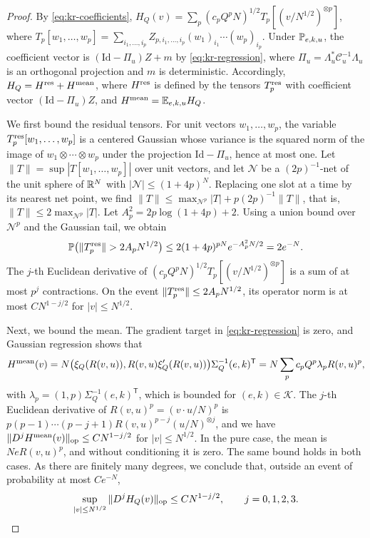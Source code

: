 \begin{proof}
By \eqref{eq:kr-coefficients}, $H_Q(v)=\sum_p(c_pQ^pN)^{1/2}T_p[(v/N^{1/2})^{\otimes p}]$, where $T_p[w_1,\dots,w_p]=\sum_{i_1,\dots,i_p}Z_{p,i_1,\dots,i_p}(w_1)_{i_1}\cdots(w_p)_{i_p}$. Under $\mathbb P_{e,k,u}$, the coefficient vector is $(\mathrm{Id}-\Pi_u)Z+m$ by \eqref{eq:kr-regression}, where $\Pi_u=\Lambda_u^*\mathcal C_u^{-1}\Lambda_u$ is an orthogonal projection and $m$ is deterministic. Accordingly, $H_Q=H^{\rm res}+H^{\rm mean}$, where $H^{\rm res}$ is defined by the tensors $T_p^{\rm res}$ with coefficient vector $(\mathrm{Id}-\Pi_u)Z$, and $H^{\rm mean}=\mathbb E_{e,k,u}H_Q$.

We first bound the residual tensors. For unit vectors $w_1,\dots,w_p$, the variable $T^{\rm res}_p[w_1,\dots,w_p]$ is a centered Gaussian whose variance is the squared norm of the image of $w_1\otimes\cdots\otimes w_p$ under the projection $\mathrm{Id}-\Pi_u$, hence at most one. Let $\|T\|=\sup|T[w_1,\dots,w_p]|$ over unit vectors, and let $\mathcal N$ be a $(2p)^{-1}$-net of the unit sphere of $\mathbb R^N$ with $|\mathcal N|\le(1+4p)^N$. Replacing one slot at a time by its nearest net point, we find $\|T\|\le\max_{\mathcal N^p}|T|+p(2p)^{-1}\|T\|$, that is, $\|T\|\le2\max_{\mathcal N^p}|T|$. Let $A_p^2=2p\log(1+4p)+2$. Using a union bound over $\mathcal N^p$ and the Gaussian tail, we obtain
\[
\Pp\bigl(\|T_p^{\rm res}\|>2A_pN^{1/2}\bigr)\le2(1+4p)^{pN}e^{-A_p^2N/2}=2e^{-N}.
\]
The $j$-th Euclidean derivative of $(c_pQ^pN)^{1/2}T_p[(v/N^{1/2})^{\otimes p}]$ is a sum of at most $p^j$ contractions. On the event $\|T^{\rm res}_p\|\le2A_pN^{1/2}$, its operator norm is at most $CN^{1-j/2}$ for $|v|\le N^{1/2}$.

Next, we bound the mean. The gradient target in \eqref{eq:kr-regression} is zero, and Gaussian regression shows that
\[
H^{\rm mean}(v)=N\bigl(\xi_Q(R(v,u)),R(v,u)\xi_Q'(R(v,u))\bigr)\Sigma_Q^{-1}(e,k)^{\mathsf T}=N\sum_pc_pQ^p\lambda_pR(v,u)^p,
\]
with $\lambda_p=(1,p)\Sigma_Q^{-1}(e,k)^{\mathsf T}$, which is bounded for $(e,k)\in\mathcal K$. The $j$-th Euclidean derivative of $R(v,u)^p=(v\cdot u/N)^p$ is $p(p-1)\cdots(p-j+1)R(v,u)^{p-j}(u/N)^{\otimes j}$, and we have $\|D^jH^{\rm mean}(v)\|_{\rm op}\le CN^{1-j/2}$ for $|v|\le N^{1/2}$. In the pure case, the mean is $NeR(v,u)^p$, and without conditioning it is zero. The same bound holds in both cases. As there are finitely many degrees, we conclude that, outside an event of probability at most $Ce^{-N}$,
\begin{equation}\label{eq:mo-euclid-bounds}
\sup_{|v|\le N^{1/2}}\|D^jH_Q(v)\|_{\rm op}\le CN^{1-j/2},\qquad j=0,1,2,3.
\end{equation}


\end{proof}
